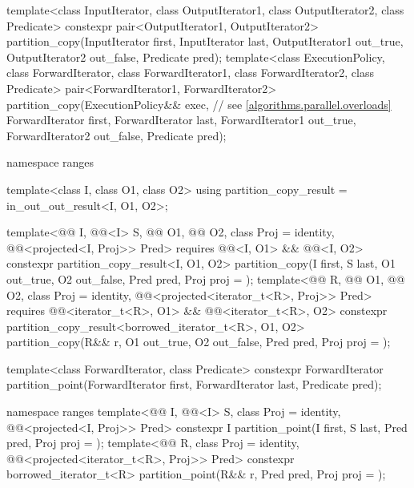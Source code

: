 \begin{codeblock}
{  template<class InputIterator, class OutputIterator1,
           class OutputIterator2, class Predicate>
    constexpr pair<OutputIterator1, OutputIterator2>
      partition_copy(InputIterator first, InputIterator last,
                     OutputIterator1 out_true, OutputIterator2 out_false,
                     Predicate pred);
  template<class ExecutionPolicy, class ForwardIterator, class ForwardIterator1,
           class ForwardIterator2, class Predicate>
    pair<ForwardIterator1, ForwardIterator2>
      partition_copy(ExecutionPolicy&& exec,                    // see \ref{algorithms.parallel.overloads}
                     ForwardIterator first, ForwardIterator last,
                     ForwardIterator1 out_true, ForwardIterator2 out_false,
                     Predicate pred);

  namespace ranges {
    template<class I, class O1, class O2>
      using partition_copy_result = in_out_out_result<I, O1, O2>;

    template<@@ I, @@<I> S,
             @@ O1, @@ O2,
             class Proj = identity, @@<projected<I, Proj>> Pred>
      requires @@<I, O1> && @@<I, O2>
      constexpr partition_copy_result<I, O1, O2>
        partition_copy(I first, S last, O1 out_true, O2 out_false, Pred pred,
                       Proj proj = {});
    template<@@ R, @@ O1, @@ O2,
             class Proj = identity,
             @@<projected<iterator_t<R>, Proj>> Pred>
      requires @@<iterator_t<R>, O1> &&
               @@<iterator_t<R>, O2>
      constexpr partition_copy_result<borrowed_iterator_t<R>, O1, O2>
        partition_copy(R&& r, O1 out_true, O2 out_false, Pred pred, Proj proj = {});
  }

  template<class ForwardIterator, class Predicate>
    constexpr ForwardIterator
      partition_point(ForwardIterator first, ForwardIterator last,
                      Predicate pred);

  namespace ranges {
    template<@@ I, @@<I> S, class Proj = identity,
             @@<projected<I, Proj>> Pred>
      constexpr I partition_point(I first, S last, Pred pred, Proj proj = {});
    template<@@ R, class Proj = identity,
             @@<projected<iterator_t<R>, Proj>> Pred>
      constexpr borrowed_iterator_t<R>
        partition_point(R&& r, Pred pred, Proj proj = {});
  }

}
\end{codeblock}
